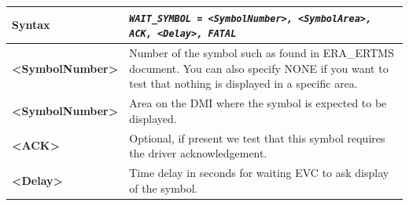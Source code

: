 \documentclass{template/openetcs}
\begin{document}
\begin{itemize}
\begin{longtable}{|l|l|}
				\hline
				
					\begin{minipage}[t]{0.22\linewidth} \textbf{Syntax}	\end{minipage}
				&	\begin{minipage}[t]{0.78\linewidth} \emph{\texttt{WAIT\_SYMBOL = <SymbolNumber>, <SymbolArea>, ACK, <Delay>, FATAL}} \end{minipage} \\
				
				\hline
				
					\begin{minipage}[t]{0.22\linewidth} \textbf{<SymbolNumber>}	\end{minipage}
				&	\begin{minipage}[t]{0.78\linewidth} Number of the symbol such as found in ERA\_ERTMS document. You can also specify NONE if you want to test that nothing is displayed in a specific area. \end{minipage} \\ \hline
				
					\begin{minipage}[t]{0.22\linewidth} \textbf{<SymbolNumber>} \end{minipage}
				&	\begin{minipage}[t]{0.78\linewidth} Area on the DMI where the symbol is expected to be displayed.\end{minipage} \\
				
				\hline
				
					\begin{minipage}[t]{0.22\linewidth} \textbf{<ACK>} \end{minipage}
				&	\begin{minipage}[t]{0.78\linewidth} Optional, if present we test that this symbol requires the driver acknowledgement. \end{minipage} \\
				
				\hline
								
					\begin{minipage}[t]{0.22\linewidth} \textbf{<Delay>} \end{minipage}
				&	\begin{minipage}[t]{0.78\linewidth} Time delay in seconds for waiting EVC to ask display of the symbol. \end{minipage} \\
				
				\hline
				

\end{longtable}
\end{itemize}
\end{document}
